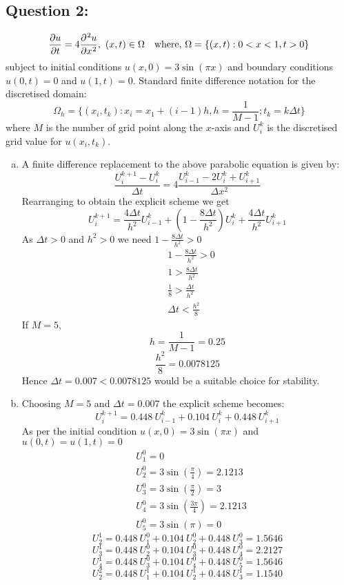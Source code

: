 \documentclass[fleqn]{article}
\begin{document}
\subsection*{Question 2:}
\[\diffp{u}{t} = 4 \diffp[2]{u}{x}, \,\, (x,t)\in \Omega\quad\text{where, }\Omega = \{ (x,t) : 0< x<1, t>0 \}\]
subject to initial conditions \(u(x,0) = 3 \sin (\pi x)\) and boundary conditions \(u(0,t) = 0\) and \(u(1,t) = 0\).
Standard finite difference notation for the discretised domain:
\[\Omega_h = \{ (x_i,t_k) : x_i = x_1 + (i-1)h, h=\frac{1}{M-1}; t_k = k\Delta t \}\]
where $M$ is the number of grid point along the $x$-axis and $U_i^k$ is the discretised grid value for $u(x_i,t_k)$.
\begin{enumerate}[a)]
\item A finite difference replacement to the above parabolic equation is given by:
\[\frac{U_i^{k+1} - U_i^k}{\Delta t} = 4 \frac{U_{i-1}^k-2U_i^k+U_{i+1}^k}{\Delta x^2}\]
Rearranging to obtain the explicit scheme we get
\[U_i^{k+1} = \frac{4\Delta t}{h^2}U_{i-1}^k+\left(1-\frac{8\Delta t}{h^2}\right)U_i^k+\frac{4\Delta t}{h^2}U_{i+1}^k\]
As $\Delta t>0$ and $h^2>0$ we need \(1-\frac{8\Delta t}{h^2} > 0\)
\begin{align*}
    &1-\frac{8\Delta t}{h^2} > 0\\
    &1 > \frac{8\Delta t}{h^2}\\
    &\frac{1}{8} > \frac{\Delta t}{h^2}\\
    &\Delta t < \frac{h^2}{8} 
\end{align*}
If $M = 5$, 
\[h = \frac{1}{M-1} = 0.25\]
\[\frac{h^2}{8} = 0.0078125\]
Hence $\Delta t = 0.007 < 0.0078125$ would be a suitable choice for stability.
\item Choosing $M = 5$ and $\Delta t = 0.007$ the explicit scheme becomes:
\[U_i^{k+1} = 0.448\ U_{i-1}^k+0.104\ U_i^k+0.448\ U_{i+1}^k\]
As per the initial condition $u(x,0) = 3\sin(\pi x)$ and $u(0,t) = u(1,t) = 0$
\begin{align*}
    &U_1^0 = 0\\
    &U_2^0 = 3\sin(\frac{\pi}{4}) = 2.1213\\
    &U_3^0 = 3\sin(\frac{\pi}{2}) = 3\\
    &U_4^0 = 3\sin(\frac{3\pi}{4}) = 2.1213\\
    &U_5^0 = 3\sin(\pi) = 0
\end{align*}
\[U_2^1 = 0.448\ U_1^0+0.104\ U_2^0+0.448\ U_3^0 = 1.5646\]
\[U_3^1 = 0.448\ U_2^0+0.104\ U_3^0+0.448\ U_4^0 = 2.2127\]
\[U_4^1 = 0.448\ U_3^0+0.104\ U_4^0+0.448\ U_5^0 = 1.5646\]
\[U_2^2 = 0.448\ U_1^1+0.104\ U_2^1+0.448\ U_3^1 = 1.1540\]

\end{enumerate}
\end{document}
